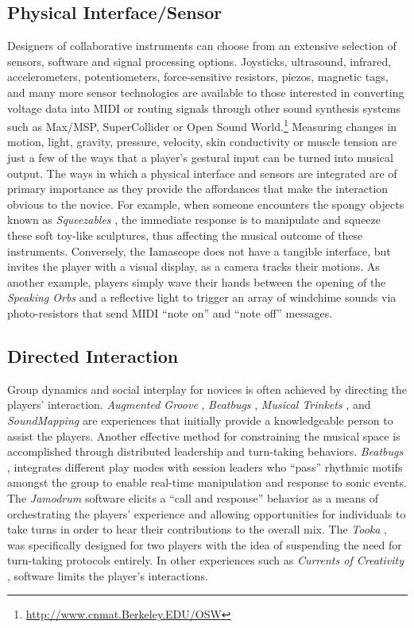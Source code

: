 \subsection{Physical Interface/Sensor}

Designers of collaborative instruments can choose from an extensive selection of
sensors, software and signal processing options.  Joysticks, ultrasound,
infrared, accelerometers, potentiometers, force-sensitive resistors, piezos,
magnetic tags, and many more sensor technologies are available to those
interested in converting voltage data into MIDI or routing signals through other
sound synthesis systems such as Max/MSP, SuperCollider or Open Sound World.\footnote{\url{http://www.cnmat.Berkeley.EDU/OSW}}  Measuring changes in motion, light,
gravity, pressure, velocity, skin conductivity or muscle tension are just a few
of the ways that a player's gestural input can be turned into musical output. The
ways in which a physical interface and sensors are integrated are of primary
importance as they provide the affordances \cite{Norman:1990} that make the interaction obvious
to the novice.  For example, when someone encounters the spongy objects known as
\textit{Squeezables} \cite{Weinberg:2001}, the immediate response is to manipulate and squeeze
these soft toy-like sculptures, thus affecting the musical outcome of these
instruments. Conversely, the Iamascope does not have a tangible interface, but
invites the player with a visual display, as a camera tracks their motions. As
another example, players simply wave their hands between the opening of the
\textit{Speaking Orbs}  \cite{E.:2001} and a reflective light to trigger an array of
windchime sounds via photo-resistors that send MIDI ``note on'' and ``note off''
messages.

\subsection{Directed Interaction}

Group dynamics and social interplay for novices is often achieved by directing
the players' interaction. \textit{Augmented Groove} \cite{Poupyrev:2001} ,\textit{ Beatbugs
} \cite{Weinberg:2002a}, \textit{Musical Trinkets } \cite{Paradiso:2001}, and\textit{ SoundMapping } \cite{Mott:1997} are
experiences that initially provide a knowledgeable person to assist the players. 
Another effective method for constraining the musical space is accomplished
through distributed leadership \cite{Cirigliano:1966} and turn-taking behaviors.  \textit{Beatbugs}
 \cite{Weinberg:2002a}, integrates different play modes with session leaders who ``pass'' rhythmic
motifs amongst the group to enable real-time manipulation and response to sonic
events. The \textit{Jamodrum}   \cite{Blaine:2000} software elicits a ``call and response''
behavior as a means of orchestrating the players' experience and allowing
opportunities for individuals to take turns in order to hear their contributions
to the overall mix. The \textit{Tooka}  \cite{Fels:2002a}, was specifically designed for two
players with the idea of suspending the need for turn-taking protocols entirely. 
 In other experiences such as \textit{Currents of Creativity} \cite{DArcangelo:2001}, software
limits the player's interactions.

